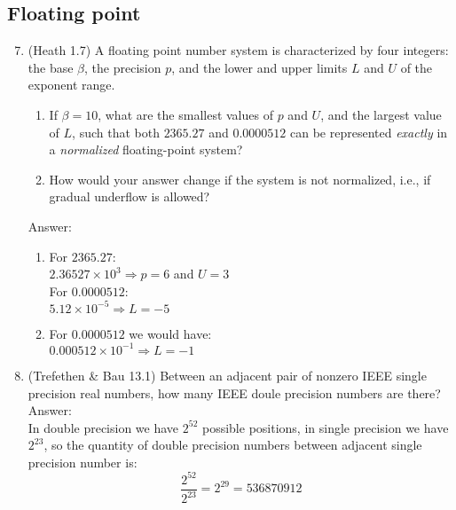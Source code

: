 \documentclass{article}
\begin{document}
\subsection*{Floating point}
\begin{enumerate}
\setcounter{enumi}{6}
\item (Heath 1.7) A floating point number system is characterized by four integers: the base $\beta$, the precision $p$,
  and the lower and upper limits $L$ and $U$ of the exponent range.  
\begin{enumerate}
\item If $\beta =10$, what are the smallest values of $p$
  and $U$, and the largest value of $L$, such that both $2365.27$ and $0.0000512$ can be represented \emph{exactly} in a
  \emph{normalized} floating-point system?
\item How would your answer change if the system is not normalized, i.e., if gradual underflow is allowed?
\end{enumerate}
Answer:\\
\begin{enumerate}
\item For $2365.27$:\\
$2.36527\times10^3 \Longrightarrow p=6$ and $U=3$\\
For $0.0000512$:\\
$5.12\times10^{-5} \Longrightarrow L=-5$
\item For $0.0000512$ we would have:\\
$0.000512\times10^{-1} \Longrightarrow L=-1$
\end{enumerate}

\item (Trefethen \& Bau 13.1) Between an adjacent pair of nonzero IEEE single precision real numbers, how many IEEE
  doule precision numbers are there?\\
  Answer:\\
  In double precision we have $2^52$ possible positions, in single precision we have $2^23$, so the quantity of double precision numbers between adjacent single precision number is:
  $$\frac{2^{52}}{2^{23}}=2^{29}=536870912$$


\end{enumerate}
\end{document}
